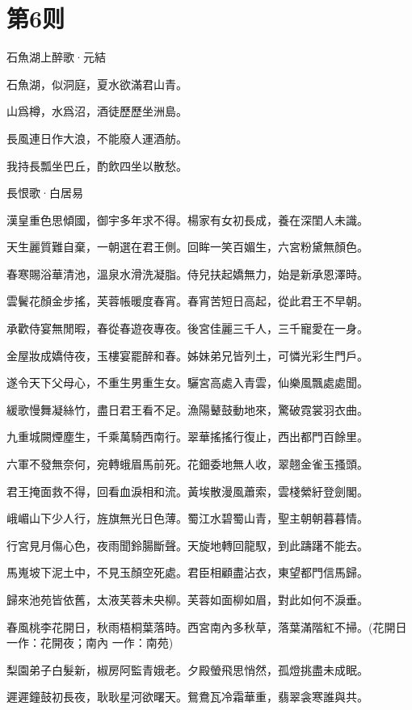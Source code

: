 \documentclass[12pt,a4paper]{ctexbook}
\begin{document}
\section{第6则}
石魚湖上醉歌·元結\par
石魚湖，似洞庭，夏水欲滿君山青。\par
山爲樽，水爲沼，酒徒歷歷坐洲島。\par
長風連日作大浪，不能廢人運酒舫。\par
我持長瓢坐巴丘，酌飲四坐以散愁。\par
長恨歌·白居易\par
漢皇重色思傾國，御宇多年求不得。楊家有女初長成，養在深閨人未識。\par
天生麗質難自棄，一朝選在君王側。回眸一笑百媚生，六宮粉黛無顏色。\par
春寒賜浴華清池，溫泉水滑洗凝脂。侍兒扶起嬌無力，始是新承恩澤時。\par
雲鬢花顏金步搖，芙蓉帳暖度春宵。春宵苦短日高起，從此君王不早朝。\par
承歡侍宴無閒暇，春從春遊夜專夜。後宮佳麗三千人，三千寵愛在一身。\par
金屋妝成嬌侍夜，玉樓宴罷醉和春。姊妹弟兄皆列土，可憐光彩生門戶。\par
遂令天下父母心，不重生男重生女。驪宮高處入青雲，仙樂風飄處處聞。\par
緩歌慢舞凝絲竹，盡日君王看不足。漁陽鼙鼓動地來，驚破霓裳羽衣曲。\par
九重城闕煙塵生，千乘萬騎西南行。翠華搖搖行復止，西出都門百餘里。\par
六軍不發無奈何，宛轉蛾眉馬前死。花鈿委地無人收，翠翹金雀玉搔頭。\par
君王掩面救不得，回看血淚相和流。黃埃散漫風蕭索，雲棧縈紆登劍閣。\par
峨嵋山下少人行，旌旗無光日色薄。蜀江水碧蜀山青，聖主朝朝暮暮情。\par
行宮見月傷心色，夜雨聞鈴腸斷聲。天旋地轉回龍馭，到此躊躇不能去。\par
馬嵬坡下泥土中，不見玉顏空死處。君臣相顧盡沾衣，東望都門信馬歸。\par
歸來池苑皆依舊，太液芙蓉未央柳。芙蓉如面柳如眉，對此如何不淚垂。\par
春風桃李花開日，秋雨梧桐葉落時。西宮南內多秋草，落葉滿階紅不掃。(花開日 一作：花開夜；南內 一作：南苑)\par
梨園弟子白髮新，椒房阿監青娥老。夕殿螢飛思悄然，孤燈挑盡未成眠。\par
遲遲鐘鼓初長夜，耿耿星河欲曙天。鴛鴦瓦冷霜華重，翡翠衾寒誰與共。\par
\end{document}
